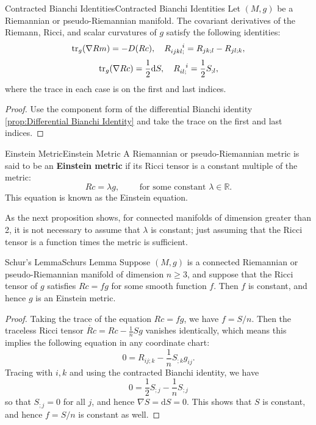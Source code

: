 \documentclass[../main.tex]{subfiles}
\begin{document}
\begin{proposition}{Contracted Bianchi Identities}{Contracted Bianchi Identities}
	Let $(M, g)$ be a Riemannian or pseudo-Riemannian manifold. The covariant derivatives of the Riemann, Ricci, and scalar curvatures of $g$ satisfy the following identities:
	\begin{equation}
		\tr_g(\nabla Rm) = -D(Rc), \quad R_{ijkl;}^{\ \ \ \ i} = R_{jk;l} - R_{jl;k},
	\end{equation}
	\begin{equation}
		\operatorname{tr}_g(\nabla Rc) = \frac{1}{2} \mathrm{d} S, \quad R_{il;}^{\ \ i} = \frac{1}{2} S_{;l},
	\end{equation}
	where the trace in each case is on the first and last indices.
\end{proposition}
\begin{proof}
	Use the component form of the differential Bianchi identity \ref{prop:Differential Bianchi Identity} and take the trace on the first and last indices.
\end{proof}

\begin{definition}{Einstein Metric}{Einstein Metric}
	A Riemannian or pseudo-Riemannian metric is said to be an \textbf{Einstein metric} if its Ricci tensor is a constant multiple of the metric:
	\begin{equation}
		Rc = \lambda g, \qquad \text{ for some constant } \lambda \in \mathbb{R}.
	\end{equation}
	This equation is known as the Einstein equation.
\end{definition}

As the next proposition shows, for connected manifolds of dimension greater than 2, it is not necessary to assume that $\lambda$ is constant; just assuming that the Ricci tensor is a function times the metric is sufficient.

\begin{proposition}{Schur's Lemma}{Schurs Lemma}
	Suppose $(M, g)$ is a connected Riemannian or pseudo-Riemannian manifold of dimension $n \geq 3$, and suppose that the Ricci tensor of $g$ satisfies $Rc = f g$ for some smooth function $f$. Then $f$ is constant, and hence $g$ is an Einstein metric.
\end{proposition}
\begin{proof}
	Taking the trace of the equation $Rc = f g$, we have $f = S/n$. Then the traceless Ricci tensor $\mathring{Rc} = Rc - \frac{1}{n} S g$ vanishes identically, which means this implies the following equation in any coordinate chart:
	\begin{equation*}
		0 = R_{ij;k} - \frac{1}{n} S_{;k} g_{ij}.
	\end{equation*}
	Tracing with $i,k$ and using the contracted Bianchi identity, we have
	\begin{equation*}
		0 = \frac{1}{2} S_{;j} - \frac{1}{n} S_{;j}
	\end{equation*}
	so that $S_{;j} = 0$ for all $j$, and hence $\nabla S = \mathrm{d} S = 0$. This shows that $S$ is constant, and hence $f = S/n$ is constant as well.
\end{proof}
\end{document}

